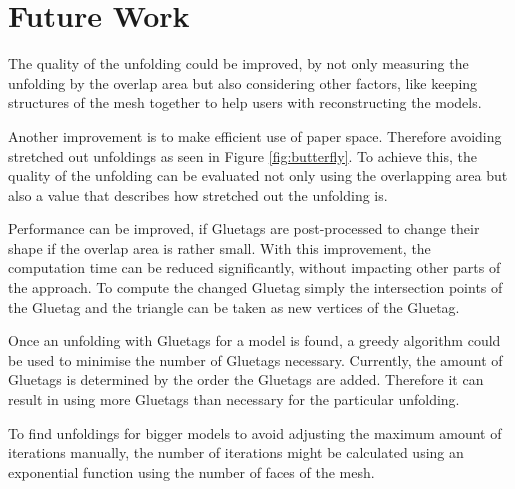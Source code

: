 \documentclass[draft,final]{vutinfth} %
\begin{document}
\section{Future Work}
The quality of the unfolding could be improved, by not only measuring the unfolding by the overlap area but also considering other factors, like keeping structures of the mesh together to help users with reconstructing the models.

Another improvement is to make efficient use of paper space. Therefore avoiding stretched out unfoldings as seen in Figure \ref{fig:butterfly}. To achieve this, the quality of the unfolding can be evaluated not only using the overlapping area but also a value that describes how stretched out the unfolding is.

Performance can be improved, if Gluetags are post-processed to change their shape if the overlap area is rather small. With this improvement, the computation time can be reduced significantly, without impacting other parts of the approach. To compute the changed Gluetag simply the intersection points of the Gluetag and the triangle can be taken as new vertices of the Gluetag.

Once an unfolding with Gluetags for a model is found, a greedy algorithm could be used to minimise the number of Gluetags necessary. Currently, the amount of Gluetags is determined by the order the Gluetags are added. Therefore it can result in using more Gluetags than necessary for the particular unfolding.

To find unfoldings for bigger models to avoid adjusting the maximum amount of iterations manually, the number of iterations might be calculated using an exponential function using the number of faces of the mesh.
\backmatter

\listoffigures %

\cleardoublepage %
\listoftables %

\listofalgorithms
{}

\printindex

\printglossaries



\end{document}

